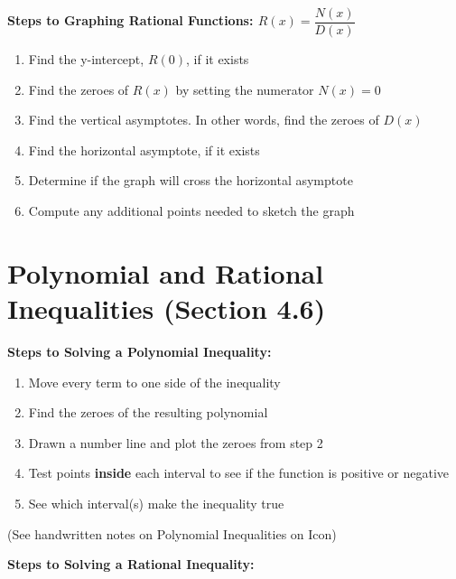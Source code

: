 \documentclass[12pt]{article}
\begin{document}
\textbf{Steps to Graphing Rational Functions: $R(x) = \dfrac{N(x)}{D(x)}$}

\begin{enumerate}

\item Find the y-intercept, $R(0)$, if it exists
\item Find the zeroes of $R(x)$ by setting the numerator $N(x) = 0$
\item Find the vertical asymptotes. In other words, find the zeroes of $D(x)$
\item Find the horizontal asymptote, if it exists
\item Determine if the graph will cross the horizontal asymptote
\item Compute any additional points needed to sketch the graph

\end{enumerate}

\section{Polynomial and Rational Inequalities (Section 4.6)}

\textbf{Steps to Solving a Polynomial Inequality:} 

\begin{enumerate}

\item Move every term to one side of the inequality
\item Find the zeroes of the resulting polynomial
\item Drawn a number line and plot the zeroes from step 2
\item Test points \textbf{inside} each interval to see if the function is positive or negative
\item See which interval(s) make the inequality true

\end{enumerate}

(See handwritten notes on Polynomial Inequalities on Icon)

\vspace{.5cm}

\textbf{Steps to Solving a Rational Inequality:} 
\end{document}
